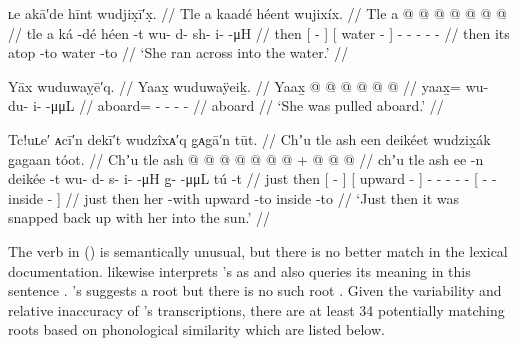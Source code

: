 \ex\label{ex:89-49-she-ran-into-water}%
%
\begingl
	\glpreamble	ʟe akā′de hīnt wudjix̣ī′x̣. //
	\glpreamble	Tle a kaadé héent wujixíx. //
	\gla	Tle {} a  @ {} {}
		{}  @ {} {}
		 @ {} @ {} @ {} @ {} @ {} //
	\glb	tle {} a ká -dé {}
		{} héen -t {}
		wu- d- sh- i-  -μH //
	\glc	then {}[   - {}]
		{}[ water - {}]
		- - - -  - //
	\gld	then {} its atop -to {}
		{} water -to {}
		 {} {} {} {} {} //
	\glft	‘She ran across into the water.’
		//
\endgl
\xe

\ex\label{ex:89-50-pulled-aboard}%
%
\begingl
	\glpreamble	Yāx wuduwaỵē′q. //
	\glpreamble	Yaax̱ wuduwaÿeiḵ. //
	\gla	Yaax̱ @  @ {} @ {} @ {} @ {} @ {} //
	\glb	yaax̱= wu- du- {} i-  -μμL //
	\glc	aboard= - - \· -  - //
	\gld	aboard  {} {} {} {} {} //
	\glft	‘She was pulled aboard.’
		//
\endgl
\xe

\ex\label{ex:89-51-snap-back}%
%
\begingl
	\glpreamble	Tc!uʟe′ ᴀcī′n dekī′t wudzîxᴀ′q g̣ᴀgā′n tūt. //
	\glpreamble	Chʼu tle ash een deikéet wudzix̱ák g̱agaan tóot. //
	\gla	Chʼu tle {} ash  @ {} {}
		{}  @ {} {}
		 @ {} @ {} @ {} @ {} @ {} +
		{}  @ {} @ {}  @ {} {} //
	\glb	chʼu tle {} ash ee -n {}
		{} deikée -t {}
		wu- d- s- i-  -μH
		{} g̱-  -μμL tú -t {} //
	\glc	just then {}[   - {}]
		{}[ upward - {}]
		- - - -  -
		{}[ -  - inside - {}] //
	\gld	just then {} her {} -with {}
		{} upward -to {}
		 {} {} {} {} {}
		{}  {} {} inside -to {} //
	\glft	‘Just then it was snapped back up with her into the sun.’
		//
\endgl
\xe

The verb  in (\lastx) is semantically unusual, but there is no better match in the lexical documentation.
\citeauthor{leer:1973} likewise interprets \citeauthor{swanton:1909}’s  as  and also queries its meaning in this sentence \parencite{leer:1977}.
\citeauthor{swanton:1909}’s  suggests a root  but there is no such root \parencite[52]{leer:1978b}.
Given the variability and relative inaccuracy of \citeauthor{swanton:1909}’s transcriptions, there are at least 34 potentially matching roots based on phonological similarity which are listed below.

